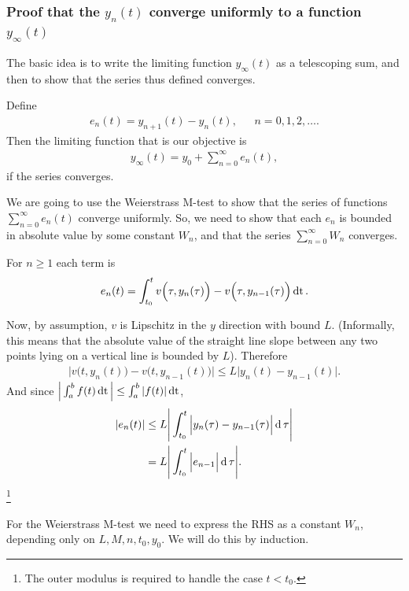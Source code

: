 \subsubsection{Proof that the $y_n(t)$ converge uniformly to a function $y_\infty(t)$}
The basic idea is to write the limiting function $y_\infty(t)$ as a telescoping
sum, and then to show that the series thus defined converges.

Define
\begin{align*}
  e_n(t) = y_{n+1}(t) - y_n(t), ~~~~~~~ n = 0, 1, 2, \ldots.
\end{align*}
Then the limiting function that is our objective is
\begin{align*}
  y_\infty(t) = y_0 + \sum_{n=0}^\infty e_n(t),
\end{align*}
if the series converges.

We are going to use the Weierstrass M-test to show that the series of functions
$\sum_{n=0}^\infty e_n(t)$ converge uniformly. So, we need to show that each
$e_n$ is bounded in absolute value by some constant $W_n$, and that the series
$\sum_{n=0}^\infty W_n$ converges.

For $n \geq 1$ each term is
\begin{align*}
  e_{n}(t) = \int_{t_0}^t v\Big(\tau, y_n(\tau)\Big) -
                         v\Big(\tau, y_{n-1}(\tau)\Big) \operatorname{\text{dt}}.
\end{align*}

Now, by assumption, $v$ is Lipschitz in the $y$ direction with bound
$L$. (Informally, this means that the absolute value of the straight line slope
between any two points lying on a vertical line is bounded by $L$). Therefore
\begin{align*}
      \Big|v\Big(t, y_n(t)\Big) -
           v\Big(t, y_{n-1}(t)\Big)\Big|
\leq L\Big|y_n(t) - y_{n-1}(t)\Big|.
\end{align*}
And since $\Big|\int_a^b f(t) \operatorname{\text{dt}}\Big| \leq \int_a^b |f(t)| \operatorname{\text{dt}}$,
\begin{align*}
  |e_n(t)|
  &\leq L\Bigg|\int_{t_0}^t \Big|y_n(\tau) - y_{n-1}(\tau)\Big| \operatorname{\text{d}}\tau \Bigg|\\
  &   = L\Bigg|\int_{t_0}^t \Big|e_{n-1}\Big| \operatorname{\text{d}}\tau \Bigg|.
\end{align*}
\footnote{The outer modulus is required to handle the case $t < t_0$.}

For the Weierstrass M-test we need to express the RHS as a constant $W_n$,
depending only on $L, M, n, t_0, y_0$. We will do this by induction.

